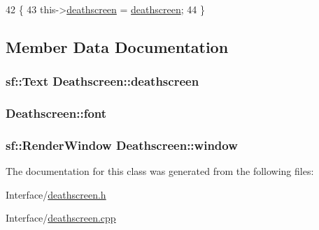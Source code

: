 \begin{DoxyCode}
42 \{
43     this->\hyperlink{classDeathscreen_a3b5e7b13ab60f8e86bfbed95245bfb7a}{deathscreen} = \hyperlink{classDeathscreen_a3b5e7b13ab60f8e86bfbed95245bfb7a}{deathscreen};
44 \}
\end{DoxyCode}


\subsection{Member Data Documentation}
\subsubsection[{\texorpdfstring{deathscreen}{deathscreen}}]{\setlength{\rightskip}{0pt plus 5cm}sf\+::\+Text Deathscreen\+::deathscreen\hspace{0.3cm}{\ttfamily [protected]}}\hypertarget{classDeathscreen_a3b5e7b13ab60f8e86bfbed95245bfb7a}{}\label{classDeathscreen_a3b5e7b13ab60f8e86bfbed95245bfb7a}
\subsubsection[{\texorpdfstring{font}{font}}]{ Deathscreen\+::font}\hypertarget{classDeathscreen_acee5dfcd2daf3847b0938d7824455966}{}\label{classDeathscreen_acee5dfcd2daf3847b0938d7824455966}
\subsubsection[{\texorpdfstring{window}{window}}]{\setlength{\rightskip}{0pt plus 5cm}sf\+::\+Render\+Window Deathscreen\+::window\hspace{0.3cm}{\ttfamily [protected]}}\hypertarget{classDeathscreen_a02a136f33b2f3beab87af2518daae693}{}\label{classDeathscreen_a02a136f33b2f3beab87af2518daae693}


The documentation for this class was generated from the following files\+:\begin{DoxyCompactItemize}
\item 
Interface/\hyperlink{deathscreen_8h}{deathscreen.\+h}\item 
Interface/\hyperlink{deathscreen_8cpp}{deathscreen.\+cpp}\end{DoxyCompactItemize}
